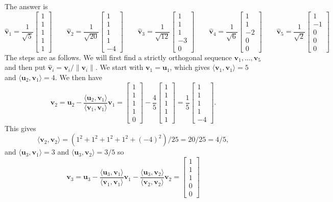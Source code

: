 \documentclass{amsart}
\newcommand{\bsm}       {\left[\begin{smallmatrix}}
\newcommand{\esm}       {\end{smallmatrix}\right]}
\newcommand{\ip}[1]     {\langle #1\rangle}
\newcommand{\vu}        {\mathbf{u}}
\newcommand{\vv}        {\mathbf{v}}
\newcommand{\hv}        {\widehat{\mathbf{v}}}
\renewcommand{\:}       {\colon}
\theoremstyle{definition}
\renewenvironment{solution}{\SolutionAtEnd}{\endSolutionAtEnd}
\begin{document}
\begin{solution}
 The  answer is 
 \[
  \hv_1 = \frac{1}{\sqrt{5}}\bsm 1\\ 1\\ 1\\ 1\\ 1\esm \hspace{2em}
  \hv_2 = \frac{1}{\sqrt{20}}\bsm 1\\ 1\\ 1\\ 1\\ -4\esm \hspace{2em}
  \hv_3 = \frac{1}{\sqrt{12}}\bsm 1\\ 1\\ 1\\ -3 \\ 0\esm \hspace{2em}
  \hv_4 = \frac{1}{\sqrt{6}}\bsm 1\\ 1\\ -2 \\ 0 \\ 0 \esm \hspace{2em}
  \hv_5 = \frac{1}{\sqrt{2}}\bsm 1\\ -1\\ 0\\ 0\\ 0\esm
 \]
 The steps are as follows.  We will first find a strictly
 orthogonal sequence $\vv_1,\dotsc,\vv_5$ and then put
 $\hv_i=\vv_i/\|\vv_i\|$.  We start with $\vv_1=\vu_1$, which gives
 $\ip{\vv_1,\vv_1}=5$ and $\ip{\vu_2,\vv_1}=4$.  We then have
 \[ \vv_2 = \vu_2 - \frac{\ip{\vu_2,\vv_1}}{\ip{\vv_1,\vv_1}}\vv_1 =
     \bsm 1\\1\\1\\1\\0 \esm -
     \frac{4}{5}\bsm 1\\1\\1\\1\\1 \esm =
     \frac{1}{5} \bsm 1\\1\\1\\1\\-4 \esm.
 \]
 This gives 
 \[ \ip{\vv_2,\vv_2}=(1^2+1^2+1^2+1^2+(-4)^2)/25 = 20/25 = 4/5,
 \]
 and $\ip{\vu_3,\vv_1}=3$ and $\ip{\vu_3,\vv_2}=3/5$ so
 \[ \vv_3 = \vu_3 - \frac{\ip{\vu_3,\vv_1}}{\ip{\vv_1,\vv_1}}\vv_1
              - \frac{\ip{\vu_3,\vv_2}}{\ip{\vv_2,\vv_2}}\vv_2
    = \bsm 1\\ 1\\ 1\\ 0\\ 0\esm 
\]
\end{solution}
\end{document}
